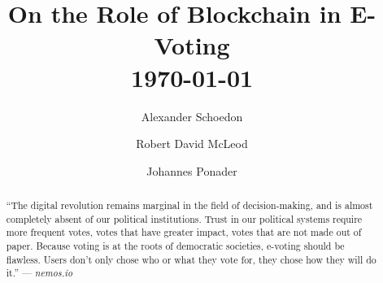 \documentclass[9pt,oneside]{amsart}
\title{On the Role of Blockchain in E-Voting \\ {\smaller \today}}
\author{
    Alexander Schoedon
}
\author{
    Robert David McLeod
}
\author{
    Johannes Ponader
}
\begin{document}
\pagecolor{lightblue}

\begin{abstract}
\enquote{The digital revolution remains marginal in the field of decision-making, and is almost completely absent of our political institutions. Trust in our political systems require more frequent votes, votes that have greater impact, votes that are not made out of paper. Because voting is at the roots of democratic societies, e-voting should be flawless. Users don't only chose who or what they vote for, they chose how they will do it.} --- \textit{nemos.io} %

\end{abstract}

\maketitle

\setlength{\columnsep}{20pt}
\begin{multicols}{2}








\end{multicols}

\printbibliography
\end{document}
